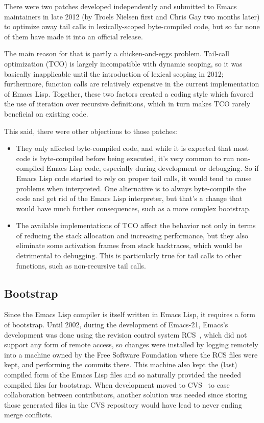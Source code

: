 \documentclass[format=acmsmall, review]{acmart}
\newcommand \Elisp {Emacs Lisp}
\begin{document}
There were two patches developed independently and submitted to Emacs
maintainers in late 2012 (by Troels Nielsen first and Chris Gay two months
later) to optimize away tail calls in lexically-scoped byte-compiled code,
but so far none of them have made it into an official release.

The main reason for that is partly a chicken-and-eggs problem.  Tail-call
optimization (TCO) is largely incompatible with dynamic scoping, so it was
basically inapplicable until the introduction of lexical scoping in 2012;
furthermore, function calls are relatively expensive in the current
implementation of \Elisp{}.  Together, these two factors created a coding
style which favored the use of iteration over recursive definitions, which
in turn makes TCO rarely beneficial on existing code.

This said, there were other objections to those patches:
\begin{itemize}
\item They only affected byte-compiled code, and while it is expected that
  most code is byte-compiled before being executed, it's very common to run
  non-compiled \Elisp{} code, especially during development or debugging.
  So if \Elisp{} code started to rely on proper tail calls, it would tend to cause problems
  when interpreted.  One alternative is to always byte-compile the code and
  get rid of the \Elisp{} interpreter, but that's a change that would have
  much further consequences, such as a more complex bootstrap.
\item The available implementations of TCO affect the behavior not only in
  terms of reducing the stack
  allocation and increasing performance, but they also eliminate some
  activation frames from stack backtraces, which would be detrimental to
  debugging.  This is particularly true for tail calls to
  other functions, such as non-recursive tail calls.
\end{itemize}

\subsection{Bootstrap}
\label{sec:bootstrap}

Since the \Elisp{} compiler is itself written in \Elisp{}, it requires
a form of bootstrap.  Until 2002, during the development of Emacs-21, Emacs's
development was done using the revision control system RCS~\cite{Tichy85},
which did not support any form of remote access, so
changes were installed by logging remotely into a machine owned by the
Free Software Foundation where the RCS files were kept, and
performing the commits there.  This machine also kept the (last) compiled
form of the \Elisp{} files and so naturally provided the needed compiled
files for bootstrap.  When development moved to CVS~\cite{Berliner90} to ease
collaboration between contributors, another solution was needed since
storing those generated files in the CVS repository
would have lead to never ending merge conflicts.
\end{document}
